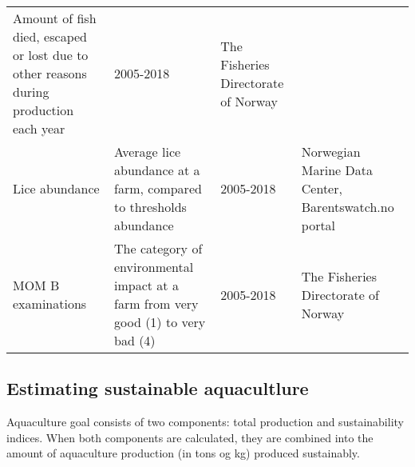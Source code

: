 \documentclass[
]{book}
\begin{document}
\begin{longtable}[]{@{}llll@{}}
\begin{minipage}[t]{0.22\columnwidth}
Amount of fish died, escaped or lost due to other reasons during production each year\strut
\end{minipage} & \begin{minipage}[t]{0.25\columnwidth}\raggedright
2005-2018\strut
\end{minipage} & \begin{minipage}[t]{0.18\columnwidth}\raggedright
The Fisheries Directorate of Norway\strut
\end{minipage}\tabularnewline
\begin{minipage}[t]{0.23\columnwidth}\raggedright
Lice abundance\strut
\end{minipage} & \begin{minipage}[t]{0.22\columnwidth}\raggedright
Average lice abundance at a farm, compared to thresholds abundance\strut
\end{minipage} & \begin{minipage}[t]{0.25\columnwidth}\raggedright
2005-2018\strut
\end{minipage} & \begin{minipage}[t]{0.18\columnwidth}\raggedright
Norwegian Marine Data Center, Barentswatch.no portal\strut
\end{minipage}\tabularnewline
\begin{minipage}[t]{0.23\columnwidth}\raggedright
MOM B examinations\strut
\end{minipage} & \begin{minipage}[t]{0.22\columnwidth}\raggedright
The category of environmental impact at a farm from very good (1) to very bad (4)\strut
\end{minipage} & \begin{minipage}[t]{0.25\columnwidth}\raggedright
2005-2018\strut
\end{minipage} & \begin{minipage}[t]{0.18\columnwidth}\raggedright
The Fisheries Directorate of Norway\strut
\end{minipage}\tabularnewline
\bottomrule
\end{longtable}

\hypertarget{estimating-sustainable-aquacultlure}{%
\subsection{Estimating sustainable aquacultlure}\label{estimating-sustainable-aquacultlure}}

Aquaculture goal consists of two components: total production and sustainability indices. When both components are calculated, they are combined into the amount of aquaculture production (in tons og kg) produced sustainably.
\end{document}
